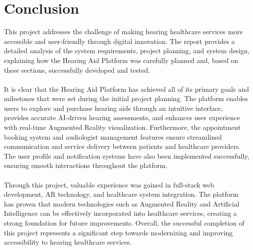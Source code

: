\documentclass{article}
\begin{document}
\section{Conclusion}
This project addresses the challenge of making hearing healthcare services more accessible and user-friendly through digital innovation. The report provides a detailed analysis of the system requirements, project planning, and system design, explaining how the Hearing Aid Platform was carefully planned and, based on these sections, successfully developed and tested.
\\\\
It is clear that the Hearing Aid Platform has achieved all of its primary goals and milestones that were set during the initial project planning. The platform enables users to explore and purchase hearing aids through an intuitive interface, provides accurate AI-driven hearing assessments, and enhances user experience with real-time Augmented Reality visualization. Furthermore, the appointment booking system and audiologist management features ensure streamlined communication and service delivery between patients and healthcare providers. The user profile and notification systems have also been implemented successfully, ensuring smooth interactions throughout the platform.
\\\\
Through this project, valuable experience was gained in full-stack web development, AR technology, and healthcare system integration. The platform has proven that modern technologies such as Augmented Reality and Artificial Intelligence can be effectively incorporated into healthcare services, creating a strong foundation for future improvements. Overall, the successful completion of this project represents a significant step towards modernizing and improving accessibility to hearing healthcare services.
\end{document}
